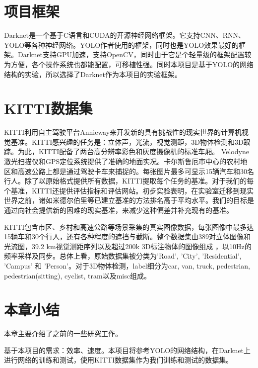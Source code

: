\section{项目框架}{
	Darknet是一个基于C语言和CUDA的开源神经网络框架。它支持CNN、RNN、YOLO等各种神经网络。YOLO作者使用的框架，同时也是YOLO效果最好的框架。Darknet支持GPU加速，支持OpenCV，同时由于它是个轻量级的框架配置较为方便，各个操作系统也都能配置，可移植性强。同时本项目是基于YOLO的网络结构的实验，所以选择了Darknet作为本项目的实验框架。
}

\section{KITTI数据集}{
	KITTI利用自主驾驶平台Annieway来开发新的具有挑战性的现实世界的计算机视觉基准。KITTI感兴趣的任务是：立体声，光流，视觉测距，3D物体检测和3D跟踪。为此，KITTI配备了两台高分辨率彩色和灰度摄像机的标准车厢。 Velodyne激光扫描仪和GPS定位系统提供了准确的地面实况。卡尔斯鲁厄市中心的农村地区和高速公路上都是通过驾驶卡车来捕捉的。每张图片最多可显示15辆汽车和30名行人。除了以原始格式提供所有数据，KITTI提取每个任务的基准。对于我们的每个基准，KITTI还提供评估指标和评估网站。初步实验表明，在实验室迁移到现实世界之前，诸如米德尔伯里等已建立基准的方法排名高于平均水平。我们的目标是通过向社会提供新的困难的现实基准，来减少这种偏差并补充现有的基准。

	KITTI包含市区、乡村和高速公路等场景采集的真实图像数据，每张图像中最多达15辆车和30个行人，还有各种程度的遮挡与截断。整个数据集由389对立体图像和光流图，39.2 km视觉测距序列以及超过200k 3D标注物体的图像组成 ，以10Hz的频率采样及同步。总体上看，原始数据集被分类为’Road’, ’City’, ’Residential’, ’Campus’ 和 ’Person’。对于3D物体检测，label细分为car, van, truck, pedestrian, pedestrian(sitting), cyclist, tram以及misc组成。
}

\section{本章小结}{
	本章主要介绍了之前的一些研究工作。

	基于本项目的需求：效率、速度。本项目将参考YOLO的网络结构，在Darknet上进行网络的训练和测试，使用KITTI数据集作为我们训练和测试的数据集。
}
